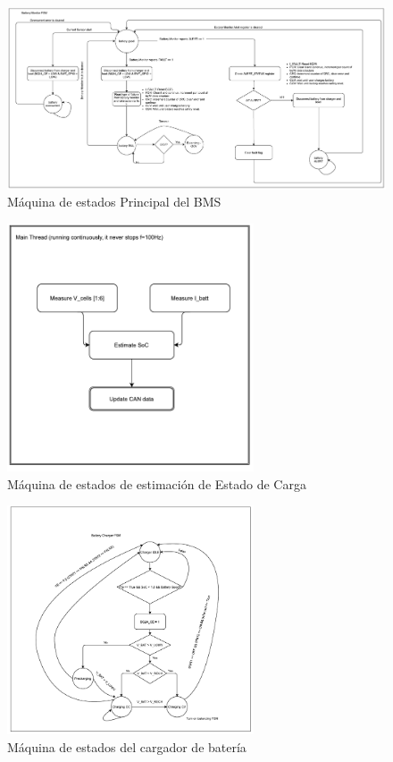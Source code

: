 \documentclass[10pt, a4paper]{report}
\begin{document}
\begin{figure}[h!]
	\begin{center}
		\includegraphics[width=1\textwidth]{BMS_FSM.pdf}
		\caption{Máquina de estados Principal del BMS} 
		\label{fig::BMS_FSM}
	\end{center}
\end{figure}
\FloatBarrier
\begin{figure}[h!]
	\begin{center}
		\includegraphics[width=0.65\textwidth]{SOC_FSM.pdf}
		\caption{Máquina de estados de estimación de Estado de Carga} 
		\label{fig::SOC_FSM}
	\end{center}
\end{figure}
\FloatBarrier
\begin{figure}[h!]
	\begin{center}
		\includegraphics[width=0.65\textwidth]{Charger_FSM.pdf}
		\caption{Máquina de estados del cargador de batería} 
		\label{fig::Charger_FSM}
	\end{center}
\end{figure}
\end{document}
